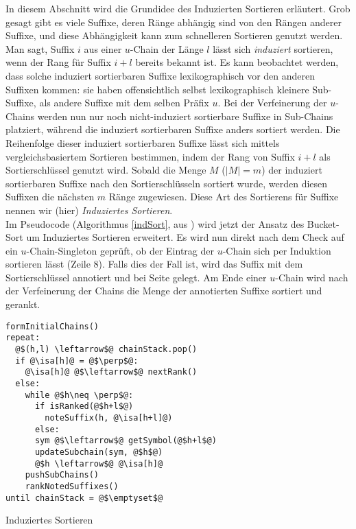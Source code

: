 In diesem Abschnitt wird die Grundidee des Induzierten Sortieren erläutert. Grob gesagt gibt es viele Suffixe, deren Ränge abhängig sind von den Rängen anderer Suffixe, und diese Abhängigkeit kann zum schnelleren Sortieren genutzt werden.
Man sagt, Suffix $i$ aus einer $u$-Chain der Länge $l$ lässt sich \textit{induziert} sortieren, wenn der Rang für Suffix $i+l$ bereits bekannt ist.
Es kann beobachtet werden, dass solche induziert sortierbaren Suffixe lexikographisch vor den anderen Suffixen kommen: sie haben offensichtlich selbst lexikographisch kleinere Sub-Suffixe, als andere Suffixe mit dem selben Präfix $u$.
Bei der Verfeinerung der $u$-Chains werden nun nur noch nicht-induziert sortierbare Suffixe in Sub-Chains platziert, während die induziert sortierbaren Suffixe anders sortiert werden. Die Reihenfolge dieser induziert sortierbaren Suffixe lässt sich mittels vergleichsbasiertem Sortieren bestimmen, indem der Rang von Suffix $i+l$ als Sortierschlüssel genutzt wird. Sobald die Menge $M$ ($|M| = m$) der induziert sortierbaren Suffixe nach den Sortierschlüsseln sortiert wurde, werden diesen Suffixen die nächsten $m$ Ränge zugewiesen. Diese Art des Sortierens für Suffixe nennen wir (hier) \textit{Induziertes Sortieren}.\\

Im Pseudocode (Algorithmus \ref{indSort}, aus \cite{Maniscalco}) wird jetzt der Ansatz des Bucket-Sort um Induziertes Sortieren erweitert. Es wird nun direkt nach dem Check auf ein $u$-Chain-Singleton geprüft, ob der Eintrag der $u$-Chain sich per Induktion sortieren lässt (Zeile 8). Falls dies der Fall ist, wird das Suffix mit dem Sortierschlüssel annotiert und bei Seite gelegt. Am Ende einer $u$-Chain wird nach der Verfeinerung der Chains die Menge der annotierten Suffixe sortiert und gerankt.

\begin{listing}[htp]
\begin{verbatim}
formInitialChains()
repeat:
  @$(h,l) \leftarrow$@ chainStack.pop()	
  if @\isa[h]@ = @$\perp$@:
    @\isa[h]@ @$\leftarrow$@ nextRank()		
  else:
    while @$h\neq \perp$@:
      if isRanked(@$h+l$@)
        noteSuffix(h, @\isa[h+l]@)
      else:
      sym @$\leftarrow$@ getSymbol(@$h+l$@)
      updateSubchain(sym, @$h$@)
      @$h \leftarrow$@ @\isa[h]@
    pushSubChains()	
    rankNotedSuffixes()
until chainStack = @$\emptyset$@
\end{verbatim}
\caption{Induziertes Sortieren}
\label{indSort}
\end{listing}

